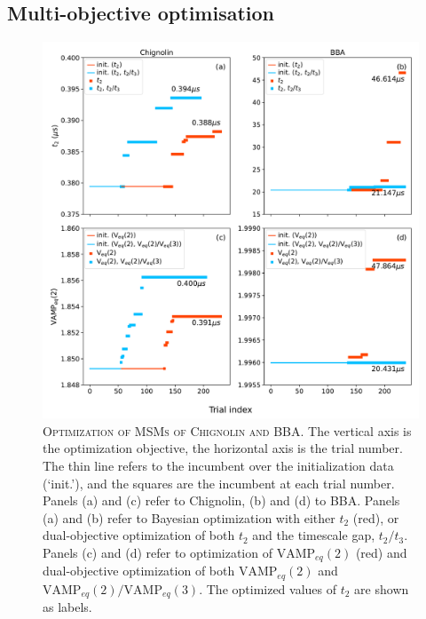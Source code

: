 \documentclass{article}
\begin{document}
\FloatBarrier
\clearpage


\subsection{Multi-objective optimisation}

\begin{figure}[ht]
    \centering
    \includegraphics[width=\columnwidth]{results3/optimisation_summary.pdf}
    \caption{\textsc{Optimization of MSMs of Chignolin and BBA}. The vertical axis is the optimization objective, the horizontal axis is the trial number. The thin line refers to the incumbent over the initialization data (`init.'), and the squares are the incumbent at each trial number. Panels (a) and (c) refer to Chignolin, (b) and (d) to BBA. Panels (a) and (b) refer to Bayesian optimization with either $t_{2}$  (red), or dual-objective optimization of both $t_{2}$ and the timescale gap, $t_{2}/t_{3}$.  Panels (c) and (d) refer to optimization of  $\mathrm{VAMP}_{eq}(2)$ (red) and dual-objective optimization of both  $\mathrm{VAMP}_{eq}(2)$ and $\mathrm{VAMP}_{eq}(2)/\mathrm{VAMP}_{eq}(3)$. The optimized values of $t_2$ are shown as labels. }
    \label{fig:optimisation_trials}
\end{figure}
\end{document}

